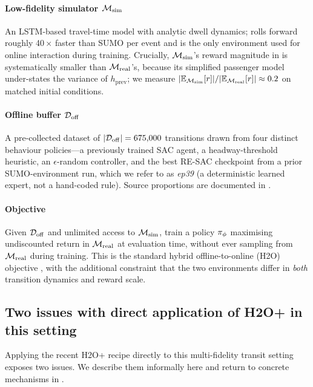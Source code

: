 \paragraph{Low-fidelity simulator $\mathcal{M}_{\mathrm{sim}}$}
An LSTM-based travel-time model with analytic dwell dynamics; rolls forward roughly 40\,$\times$ faster than SUMO per event and is the only environment used for online interaction during training.
Crucially, $\mathcal{M}_{\mathrm{sim}}$'s reward magnitude in  is systematically smaller than $\mathcal{M}_{\mathrm{real}}$'s, because its simplified passenger model under-states the variance of $h_{\text{prev}}$; we measure $|\mathbb{E}_{\mathcal{M}_{\mathrm{sim}}}[r]| / |\mathbb{E}_{\mathcal{M}_{\mathrm{real}}}[r]| \approx 0.2$ on matched initial conditions.

\paragraph{Offline buffer $\mathcal{D}_{\mathrm{off}}$}
A pre-collected dataset of $\lvert \mathcal{D}_{\mathrm{off}} \rvert = 675{,}000$ transitions drawn from four distinct behaviour policies---a previously trained SAC agent, a headway-threshold heuristic, an $\epsilon$-random controller, and the best RE-SAC checkpoint from a prior SUMO-environment run, which we refer to as \emph{ep39} (a deterministic learned expert, not a hand-coded rule).
Source proportions are documented in .

\paragraph{Objective}
Given $\mathcal{D}_{\mathrm{off}}$ and unlimited access to $\mathcal{M}_{\mathrm{sim}}$, train a policy $\pi_\phi$ maximising undiscounted return in $\mathcal{M}_{\mathrm{real}}$ at evaluation time, without ever sampling from $\mathcal{M}_{\mathrm{real}}$ during training.
This is the standard hybrid offline-to-online (H2O) objective \citep{niu2022h2o}, with the additional constraint that the two environments differ in \emph{both} transition dynamics and reward scale.

\subsection{Two issues with direct application of H2O+ in this setting}
\label{sec:problem:failures}

Applying the recent H2O+ recipe \citep{liu2024h2oplus} directly to this multi-fidelity transit setting exposes two issues.
We describe them informally here and return to concrete mechanisms in .

